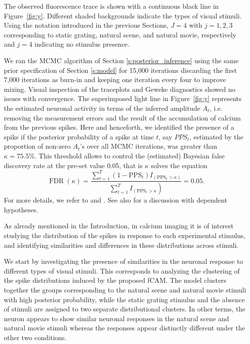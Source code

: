 The observed fluorescence trace is shown with a continuous black line in Figure~\ref{fig:y}. Different shaded backgrounds indicate the types of visual stimuli.
Using the notation introduced in the previous Sections, $J=4$ with $j=1, 2, 3$ corresponding to static grating, natural scene, and natural movie, respectively and $j=4$ indicating no stimulus presence. 


We ran the MCMC algorithm of Section \ref{s:posterior_inference} using the same prior specification of Section \ref{s:model} for 15{,}000 iterations discarding the first 7{,}000 iterations as burn-in and keeping one iteration every four to improve mixing.  Visual inspection of the traceplots and Geweke diagnostics showed no issues with convergence. 
%
The superimposed light line in Figure~\ref{fig:y} represents the estimated neuronal activity in terms of the inferred amplitude $A_t$, i.e. removing the measurement errors and the result of the accumulation of calcium from the previous spikes. Here and henceforth, we identified the presence of a spike if the  posterior probability of a spike at time $t$, say $PPS_t$, estimated by the proportion of non-zero $A_t$'s over all MCMC iterations, was greater than  $\kappa=75.5\%$. This threshold allows to control the (estimated) Bayesian false discovery rate at the pre-set value 0.05, that is $\kappa$ solves the equation $$\operatorname{FDR}\left(\kappa\right)=\frac{\sum_{t=1}^{T}\left(1-\mathrm{PPS}_{t}\right) I_{\left(\mathrm{PPS}_{t}>\kappa\right)}}{ \left.\sum_{t=1}^{T} I_{\left(\mathrm{PPS}_{t}>\kappa\right.}\right)}=0.05.$$ For more details, we refer to \citet{newton2004} and \citet{Muller07}. See also \citet{SunReich2015} for a discussion with dependent hypotheses.
%

%
As already mentioned in the Introduction, in calcium imaging it is of interest studying the distribution of the spikes in response to each experimental stimulus, and identifying similarities and differences in these distributions across stimuli. 

We start by investigating the presence of similarities in the neuronal response to different types of visual stimuli. This corresponds to analyzing the clustering of the spike distributions induced by the proposed fCAM. The model clusters together the groups corresponding to the natural scene and natural movie stimuli with high posterior probability, while the static grating stimulus and the absence of stimuli are assigned to two separate distributional clusters. In other terms, the neuron appears to show similar neuronal responses in the natural scene and natural movie stimuli whereas the responses appear distinctly different under the other two conditions. 



